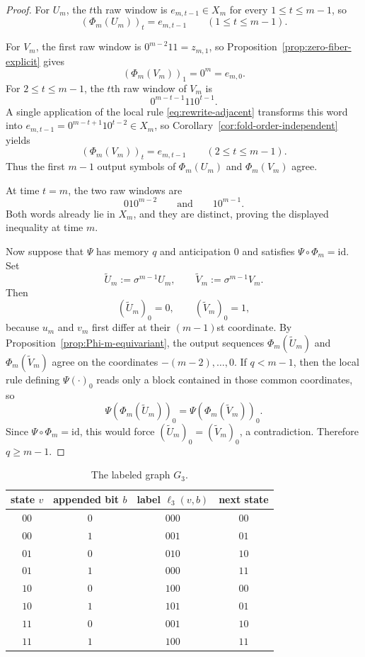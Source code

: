 \begin{proof}
For $U_m$, the $t$th raw window is $e_{m,t-1}\in X_m$ for every
$1\le t\le m-1$, so
\[
(\Phi_m(U_m))_t=e_{m,t-1}
\qquad (1\le t\le m-1).
\]

For $V_m$, the first raw window is $0^{m-2}11=z_{m,1}$, so
Proposition~\ref{prop:zero-fiber-explicit} gives
\[
(\Phi_m(V_m))_1=0^m=e_{m,0}.
\]
For $2\le t\le m-1$, the $t$th raw window of $V_m$ is
\[
0^{m-t-1}110^{t-1}.
\]
A single application of the local rule \eqref{eq:rewrite-adjacent} transforms
this word into $e_{m,t-1}=0^{m-t+1}10^{t-2}\in X_m$, so
Corollary~\ref{cor:fold-order-independent} yields
\[
(\Phi_m(V_m))_t=e_{m,t-1}
\qquad (2\le t\le m-1).
\]
Thus the first $m-1$ output symbols of $\Phi_m(U_m)$ and $\Phi_m(V_m)$ agree.

At time $t=m$, the two raw windows are
\[
010^{m-2}
\qquad\text{and}\qquad
10^{m-1}.
\]
Both words already lie in $X_m$, and they are distinct, proving the displayed
inequality at time $m$.

Now suppose that $\Psi$ has memory $q$ and anticipation $0$ and satisfies
$\Psi\circ\Phi_m=\mathrm{id}$.  Set
\[
\widetilde U_m:=\sigma^{m-1}U_m,
\qquad
\widetilde V_m:=\sigma^{m-1}V_m.
\]
Then
\[
(\widetilde U_m)_0=0,
\qquad
(\widetilde V_m)_0=1,
\]
because $u_m$ and $v_m$ first differ at their $(m-1)$st coordinate.  By
Proposition~\ref{prop:Phi-m-equivariant}, the output sequences
$\Phi_m(\widetilde U_m)$ and $\Phi_m(\widetilde V_m)$ agree on the coordinates
$-(m-2),\ldots,0$.  If $q<m-1$, then the local rule defining $\Psi(\cdot)_0$
reads only a block contained in those common coordinates, so
\[
\Psi(\Phi_m(\widetilde U_m))_0=\Psi(\Phi_m(\widetilde V_m))_0.
\]
Since $\Psi\circ\Phi_m=\mathrm{id}$, this would force
$(\widetilde U_m)_0=(\widetilde V_m)_0$, a contradiction.  Therefore
$q\ge m-1$.
\end{proof}

\begin{table}[t]
\centering
\small
\begin{tabular}{cccc}
\toprule
state $v$ & appended bit $b$ & label $\ell_3(v,b)$ & next state \\
\midrule
$00$ & $0$ & $000$ & $00$ \\
$00$ & $1$ & $001$ & $01$ \\
$01$ & $0$ & $010$ & $10$ \\
$01$ & $1$ & $000$ & $11$ \\
$10$ & $0$ & $100$ & $00$ \\
$10$ & $1$ & $101$ & $01$ \\
$11$ & $0$ & $001$ & $10$ \\
$11$ & $1$ & $100$ & $11$ \\
\bottomrule
\end{tabular}
\caption{The labeled graph $G_3$.}
\label{tab:G3}
\end{table}


